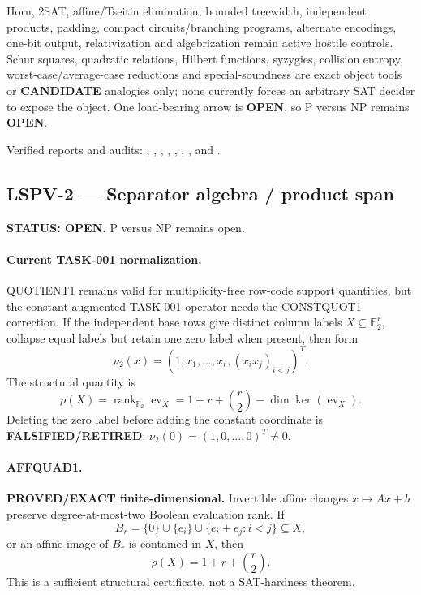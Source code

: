 \documentclass[11pt]{article}
\begin{document}
Horn, 2SAT, affine/Tseitin elimination, bounded treewidth, independent
products, padding, compact circuits/branching programs, alternate encodings,
one-bit output, relativization and algebrization remain active hostile
controls.  Schur squares, quadratic relations, Hilbert functions, syzygies,
collision entropy, worst-case/average-case reductions and special-soundness
are exact object tools or \textbf{CANDIDATE} analogies only; none currently
forces an arbitrary SAT decider to expose the object.  One load-bearing
arrow is \textbf{OPEN}, so P versus NP remains \textbf{OPEN}.

Verified reports and audits:
,
,
,
,
,
,
, and
.

\subsection{LSPV-2 --- Separator algebra / product span}
\textbf{STATUS: OPEN.} P versus NP remains open.

\paragraph{Current TASK-001 normalization.}
QUOTIENT1 remains valid for multiplicity-free row-code support quantities, but the constant-augmented TASK-001 operator needs the CONSTQUOT1 correction.  If the independent base rows give distinct column labels \(X\subseteq\mathbb F_2^r\), collapse equal labels but retain one zero label when present, then form
\[
 \nu_2(x)=\left(1,x_1,\ldots,x_r,(x_ix_j)_{i<j}\right)^T.
\]
The structural quantity is
\[
 \rho(X)=\operatorname{rank}_{\mathbb F_2}\operatorname{ev}_X
 =1+r+\binom r2-\dim\ker(\operatorname{ev}_X).
\]
Deleting the zero label before adding the constant coordinate is \textbf{FALSIFIED/RETIRED}: \(\nu_2(0)=(1,0,\ldots,0)^T\neq0\).

\paragraph{AFFQUAD1.}
\textbf{PROVED/EXACT finite-dimensional.}  Invertible affine changes \(x\mapsto Ax+b\) preserve degree-at-most-two Boolean evaluation rank.  If
\[
 B_r=\{0\}\cup\{e_i\}\cup\{e_i+e_j:i<j\}\subseteq X,
\]
or an affine image of \(B_r\) is contained in \(X\), then
\[
 \rho(X)=1+r+\binom r2.
\]
This is a sufficient structural certificate, not a SAT-hardness theorem.
\end{document}
